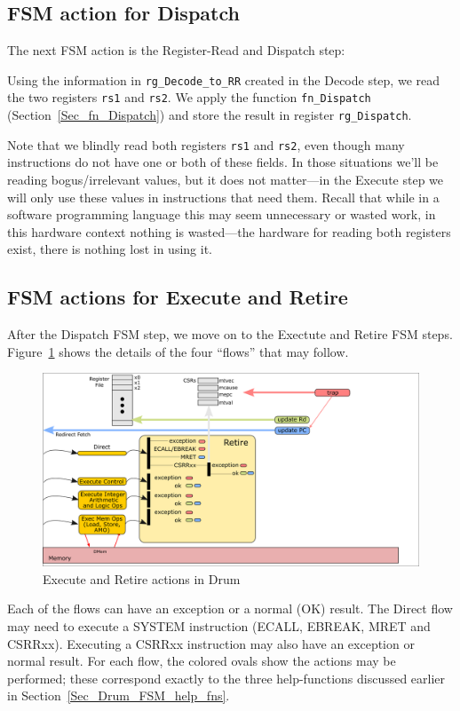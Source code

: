 
\subsection{FSM action for Dispatch}

The next FSM action is the Register-Read and Dispatch step:



Using the information in \verb|rg_Decode_to_RR| created in the Decode
step, we read the two registers \verb|rs1| and \verb|rs2|.  We apply
the function \verb|fn_Dispatch| (Section~\ref{Sec_fn_Dispatch}) and
store the result in register \verb|rg_Dispatch|.

Note that we blindly read both registers \verb|rs1| and \verb|rs2|,
even though many instructions do not have one or both of these fields.
In those situations we'll be reading bogus/irrelevant values, but it
does not matter---in the Execute step we will only use these values in
instructions that need them. Recall that while in a software
programming language this may seem unnecessary or wasted work, in this
hardware context nothing is wasted---the hardware for reading both
registers exist, there is nothing lost in using it.


\subsection{FSM actions for Execute and Retire}

After the Dispatch FSM step, we move on to the Exectute and Retire FSM
steps.  Figure~\ref{Fig_Retire_Drum} shows the details of the four
``flows'' that may follow.
\begin{figure}[htbp]
  \centerline{\includegraphics[width=6in,angle=0]{Figures/Fig_Retire_Layers_1}}
  \caption{\label{Fig_Retire_Drum}Execute and Retire actions in Drum}
\end{figure}
Each of the flows can have an exception or a normal (OK) result.  The
Direct flow may need to execute a SYSTEM instruction (ECALL, EBREAK,
MRET and CSRRxx).  Executing a CSRRxx instruction may also have an
exception or normal result.  For each flow, the colored ovals show the
actions may be performed; these correspond exactly to the three
help-functions discussed earlier in Section~\ref{Sec_Drum_FSM_help_fns}.

